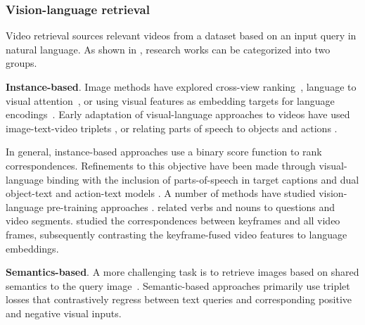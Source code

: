 \subsubsection{Vision-language retrieval} 


Video retrieval sources relevant videos from a dataset based on an input query in natural language. As shown in , research works can be categorized into two groups.


\noindent
\textbf{Instance-based}. Image methods have explored cross-view ranking~\citep{wang2016learning}, language to visual attention~\citep{torabi2016learning}, or using visual features as embedding targets for language encodings~\citep{dong2018predicting}. Early adaptation of visual-language approaches to videos have used image-text-video triplets \citep{otani2016learning}, or relating parts of speech to objects and actions \citep{gabeur2020multi,xu2015jointly}. %


In general, instance-based approaches use a binary score function to rank correspondences. Refinements to this objective have been made through visual-language binding with the inclusion of parts-of-speech in target captions \citep{wray2019fine} and dual object-text and action-text models \citep{liu2019use,mithun2018learning}. A number of methods have studied vision-language pre-training approaches \citep{ge2022bridging,lin2022egocentric,xue2022advancing}. \citet{ge2022bridging} related verbs and nouns to questions and video segments. \citet{xue2022advancing} studied the correspondences between keyframes and all video frames, subsequently contrasting the keyframe-fused video features to language embeddings.



\noindent
\textbf{Semantics-based}. A more challenging task is to retrieve images based on shared semantics to the query image~\citep{gordo2017beyond}. Semantic-based approaches primarily use triplet losses that contrastively regress between text queries and corresponding positive and negative visual inputs.

